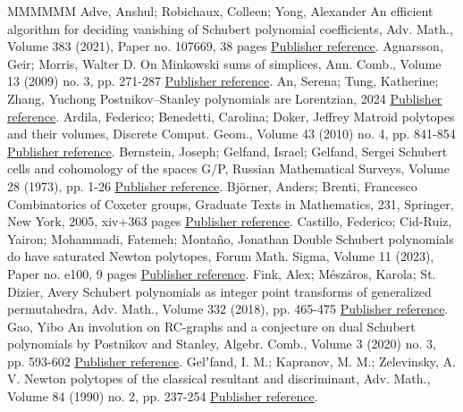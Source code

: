 \begin{thebibliography}{MMMMMM}
 Adve, Anshul; Robichaux, Colleen; Yong, Alexander An efficient algorithm for deciding vanishing of Schubert polynomial coefficients, Adv. Math., Volume 383 (2021), Paper no. 107669, 38 pages \href{https://alco.centre-mersenne.org/articles/10.5802/alco.450/#ARY}{Publisher reference}.
 Agnarsson, Geir; Morris, Walter D. On Minkowski sums of simplices, Ann. Comb., Volume 13 (2009) no. 3, pp. 271-287 \href{https://alco.centre-mersenne.org/articles/10.5802/alco.450/#2009minkowski}{Publisher reference}.
 An, Serena; Tung, Katherine; Zhang, Yuchong Postnikov–Stanley polynomials are Lorentzian, 2024 \href{https://alco.centre-mersenne.org/articles/10.5802/alco.450/#PSLorentzian}{Publisher reference}.
 Ardila, Federico; Benedetti, Carolina; Doker, Jeffrey Matroid polytopes and their volumes, Discrete Comput. Geom., Volume 43 (2010) no. 4, pp. 841-854 \href{https://alco.centre-mersenne.org/articles/10.5802/alco.450/#MatroidPolytopes}{Publisher reference}.
 Bernstein, Joseph; Gelfand, Israel; Gelfand, Sergei Schubert cells and cohomology of the spaces G/P, Russian Mathematical Surveys, Volume 28 (1973), pp. 1-26 \href{https://alco.centre-mersenne.org/articles/10.5802/alco.450/#BGG}{Publisher reference}.
 Björner, Anders; Brenti, Francesco Combinatorics of Coxeter groups, Graduate Texts in Mathematics, 231, Springer, New York, 2005, xiv+363 pages \href{https://alco.centre-mersenne.org/articles/10.5802/alco.450/#BjornerBrenti}{Publisher reference}.
 Castillo, Federico; Cid-Ruiz, Yairon; Mohammadi, Fatemeh; Montaño, Jonathan Double Schubert polynomials do have saturated Newton polytopes, Forum Math. Sigma, Volume 11 (2023), Paper no. e100, 9 pages \href{https://alco.centre-mersenne.org/articles/10.5802/alco.450/#DoubleSchSNP}{Publisher reference}.
 Fink, Alex; Mészáros, Karola; St. Dizier, Avery Schubert polynomials as integer point transforms of generalized permutahedra, Adv. Math., Volume 332 (2018), pp. 465-475 \href{https://alco.centre-mersenne.org/articles/10.5802/alco.450/#FMD}{Publisher reference}.
 Gao, Yibo An involution on RC-graphs and a conjecture on dual Schubert polynomials by Postnikov and Stanley, Algebr. Comb., Volume 3 (2020) no. 3, pp. 593-602 \href{https://alco.centre-mersenne.org/articles/10.5802/alco.450/#InvolRC}{Publisher reference}.
 Gelʼfand, I. M.; Kapranov, M. M.; Zelevinsky, A. V. Newton polytopes of the classical resultant and discriminant, Adv. Math., Volume 84 (1990) no. 2, pp. 237-254 \href{https://alco.centre-mersenne.org/articles/10.5802/alco.450/#GKZ}{Publisher reference}.

\end{thebibliography}
